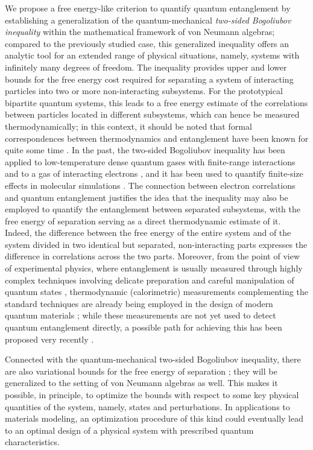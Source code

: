 \documentclass[a4paper, twoside, 11pt, reqno]{amsart}
\theoremstyle{definition}
\theoremstyle{plain}
\newcommand{\1}{\mathbf{1}}
\begin{document}
We propose a free energy-like criterion to quantify quantum entanglement by establishing a generalization of the quantum-mechanical \emph{two-sided Bogoliubov inequality} \cite{DelleSite2017, Reible2022} within the mathematical framework of von Neumann algebras; compared to the previously studied case, this generalized inequality offers an analytic tool for an extended range of physical situations, namely, systems with infinitely many degrees of freedom. The inequality provides upper and lower bounds for the free energy cost required for separating a system of interacting particles into two or more non-interacting subsystems. For the prototypical bipartite quantum systems, this leads to a free energy estimate of the correlations between particles located in different subsystems, which can hence be measured thermodynamically; in this context, it should be noted that formal correspondences between thermodynamics and entanglement have been known for quite some time \cite{Popescu1997}. In the past, the two-sided Bogoliubov inequality has been applied to low-temperature dense quantum gases with finite-range interactions \cite{DelleSite2024pra} and to a gas of interacting electrons \cite{Reible2023}, and it has been used to quantify finite-size effects in molecular simulations \cite{Reible2025apx, Reible2025camcos}. The connection between electron correlations and quantum entanglement \cite{DelleSite2015} justifies the idea that the inequality may also be employed to quantify the entanglement between separated subsystems, with the free energy of separation serving as a direct thermodynamic estimate of it. Indeed, the difference between the free energy of the entire system and of the system divided in two identical but separated, non-interacting parts expresses the difference in correlations across the two parts. Moreover, from the point of view of experimental physics, where entanglement is usually measured through highly complex techniques involving delicate preparation and careful manipulation of quantum states \cite{Laurell2025, Xie2023}, thermodynamic (calorimetric) measurements complementing the standard techniques are already being employed in the design of modern quantum materials \cite{Cole2025, Li2019}; while these measurements are not yet used to detect quantum entanglement directly, a possible path for achieving this has been proposed very recently \cite{Bakshi2024, Stamatova2025}.

Connected with the quantum-mechanical two-sided Bogoliubov inequality, there are also variational bounds for the free energy of separation \cite{Reible2022}; they will be generalized to the setting of von Neumann algebras as well. This makes it possible, in principle, to optimize the bounds with respect to some key physical quantities of the system, namely, states and perturbations. In applications to materials modeling, an optimization procedure of this kind could eventually lead to an optimal design of a physical system with prescribed quantum characteristics.
\end{document}
